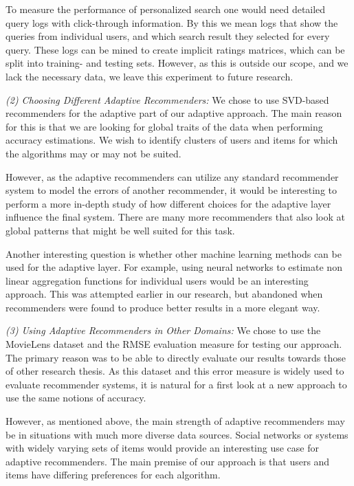 To measure the performance of personalized search one would need detailed query logs with click-through information.
By this we mean logs that show the queries from individual users, and which search result they
selected for every query.
These logs can be mined to create implicit ratings matrices, which can be split into
training- and testing sets.
However, as this is outside our scope, and we lack the necessary data,
we leave this experiment to future research.


\emph{(2) Choosing Different Adaptive Recommenders:}
We chose to use SVD-based recommenders for the adaptive part of our adaptive approach.
The main reason for this is that we are looking for global traits of the data
when performing accuracy estimations. We wish to identify
clusters of users and items for which the algorithms may or may not be suited.

However, as the adaptive recommenders can utilize any standard recommender system
to model the errors of another recommender, it would be interesting to perform
a more in-depth study of how different choices for the adaptive layer
influence the final system.
There are many more recommenders that also look at global patterns
that might be well suited for this task.

Another interesting question is whether other machine learning methods can be used for the adaptive layer.
For example, using neural networks to estimate non linear aggregation functions for individual users would be an interesting approach.
This was attempted earlier in our research, but abandoned when recommenders were found to produce
better results in a more elegant way.


\emph{(3) Using Adaptive Recommenders in Other Domains:}
We chose to use the MovieLens dataset and the RMSE evaluation measure for testing our approach.
The primary reason was to be able to directly evaluate our results towards those of other research thesis.
As this dataset and this error measure is widely used to evaluate recommender systems,
it is natural for a first look at a new approach to use the same notions of accuracy.

However, as mentioned above, the main strength of adaptive recommenders may be
in situations with much more diverse data sources. Social networks or systems
with widely varying sets of items would provide an interesting use case for adaptive recommenders.
The main premise of our approach is that users and items have differing preferences
for each algorithm. 

